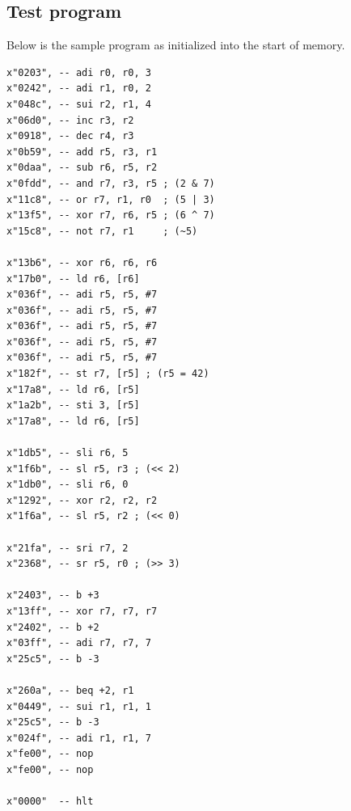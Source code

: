 \documentclass[a4paper]{article}
\numberwithin{figure}{section}
\numberwithin{table}{section}
\begin{document}
\subsection{Test program}
Below is the sample program as initialized into the start of memory.
\begin{verbatim}
x"0203", -- adi r0, r0, 3
x"0242", -- adi r1, r0, 2
x"048c", -- sui r2, r1, 4
x"06d0", -- inc r3, r2
x"0918", -- dec r4, r3
x"0b59", -- add r5, r3, r1
x"0daa", -- sub r6, r5, r2
x"0fdd", -- and r7, r3, r5 ; (2 & 7)
x"11c8", -- or r7, r1, r0  ; (5 | 3)
x"13f5", -- xor r7, r6, r5 ; (6 ^ 7)
x"15c8", -- not r7, r1     ; (~5)

x"13b6", -- xor r6, r6, r6
x"17b0", -- ld r6, [r6]
x"036f", -- adi r5, r5, #7
x"036f", -- adi r5, r5, #7
x"036f", -- adi r5, r5, #7
x"036f", -- adi r5, r5, #7
x"036f", -- adi r5, r5, #7
x"182f", -- st r7, [r5] ; (r5 = 42)
x"17a8", -- ld r6, [r5]
x"1a2b", -- sti 3, [r5]
x"17a8", -- ld r6, [r5]

x"1db5", -- sli r6, 5
x"1f6b", -- sl r5, r3 ; (<< 2)
x"1db0", -- sli r6, 0
x"1292", -- xor r2, r2, r2
x"1f6a", -- sl r5, r2 ; (<< 0)

x"21fa", -- sri r7, 2
x"2368", -- sr r5, r0 ; (>> 3)

x"2403", -- b +3
x"13ff", -- xor r7, r7, r7
x"2402", -- b +2
x"03ff", -- adi r7, r7, 7
x"25c5", -- b -3

x"260a", -- beq +2, r1
x"0449", -- sui r1, r1, 1
x"25c5", -- b -3
x"024f", -- adi r1, r1, 7
x"fe00", -- nop
x"fe00", -- nop

x"0000"  -- hlt
\end{verbatim}
\end{document}
